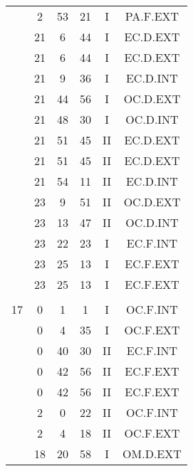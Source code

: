 \documentclass[12pt, a4paper]{article}
\begin{document}
\begin{multicols}{3}
{\begin{tabular}{c c c c c c}
	 	 	 	 & 2 & 53 & 21 & I & PA.F.EXT\\%
	 	 	 	 & 21 & 6 & 44 & I & EC.D.EXT\\%
	 	 	 	 & 21 & 6 & 44 & I & EC.D.EXT\\%
	 	 	 	 & 21 & 9 & 36 & I & EC.D.INT\\%
	 	 	 	 & 21 & 44 & 56 & I & OC.D.EXT\\%
	 	 	 	 & 21 & 48 & 30 & I & OC.D.INT\\%
	 	 	 	 & 21 & 51 & 45 & II & EC.D.EXT\\%
	 	 	 	 & 21 & 51 & 45 & II & EC.D.EXT\\%
	 	 	 	 & 21 & 54 & 11 & II & EC.D.INT\\%
	 	 	 	 & 23 & 9 & 51 & II & OC.D.EXT\\%
	 	 	 	 & 23 & 13 & 47 & II & OC.D.INT\\%
	 	 	 	 & 23 & 22 & 23 & I & EC.F.INT\\%
	 	 	 	 & 23 & 25 & 13 & I & EC.F.EXT\\%
	 	 	 	 & 23 & 25 & 13 & I & EC.F.EXT\\%
	 	 	 	 & & & & & \\%
	 	 	 	17 & 0 & 1 & 1 & I & OC.F.INT\\%
	 	 	 	 & 0 & 4 & 35 & I & OC.F.EXT\\%
	 	 	 	 & 0 & 40 & 30 & II & EC.F.INT\\%
	 	 	 	 & 0 & 42 & 56 & II & EC.F.EXT\\%
	 	 	 	 & 0 & 42 & 56 & II & EC.F.EXT\\%
	 	 	 	 & 2 & 0 & 22 & II & OC.F.INT\\%
	 	 	 	 & 2 & 4 & 18 & II & OC.F.EXT\\%
	 	 	 	 & 18 & 20 & 58 & I & OM.D.EXT\\%

\end{tabular}}
\end{multicols}
\end{document}
